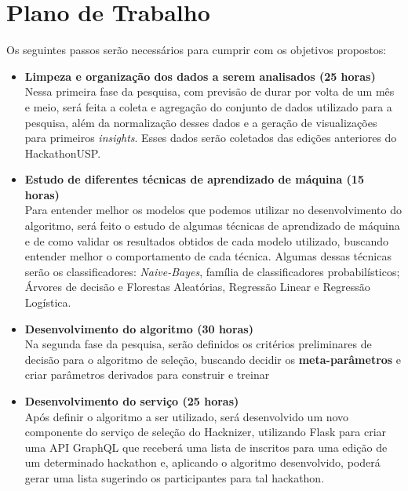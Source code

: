 \documentclass[10pt,twoside,a4paper]{article}
\begin{document}
    
\section{Plano de Trabalho}
  
  Os seguintes passos serão necessários para cumprir com os objetivos propostos:

  \begin{itemize}
    \item \textbf{Limpeza e organização dos dados a serem analisados (25 horas)} \\
        Nessa primeira fase da pesquisa, com previsão de durar por volta de um mês e meio, será feita a coleta e agregação do conjunto de dados utilizado para a pesquisa, além da normalização desses dados e a geração de visualizações para primeiros \textit{insights}. Esses dados serão coletados das edições anteriores do HackathonUSP.
    
    \item \textbf{Estudo de diferentes técnicas de aprendizado de máquina (15 horas)} \\
        Para entender melhor os modelos que podemos utilizar no desenvolvimento do algoritmo, será feito o estudo de algumas técnicas de aprendizado de máquina e de como validar os resultados obtidos de cada modelo utilizado, buscando entender melhor o comportamento de cada técnica. Algumas dessas técnicas serão os classificadores: \textit{Naive-Bayes}, família de classificadores probabilísticos; Árvores de decisão e Florestas Aleatórias, Regressão Linear e Regressão Logística. 
    
    \item \textbf{Desenvolvimento do algoritmo (30 horas)} \\
        Na segunda fase da pesquisa, serão definidos os critérios preliminares de decisão para o algoritmo de seleção, buscando decidir os \textbf{meta-parâmetros} e criar parâmetros derivados para construir e treinar 
          
    \item \textbf{Desenvolvimento do serviço (25 horas)} \\
        Após definir o algoritmo a ser utilizado, será desenvolvido um novo componente do serviço de seleção do Hacknizer, utilizando Flask para criar uma API GraphQL  que receberá uma lista de inscritos para uma edição de um determinado hackathon e, aplicando o algoritmo desenvolvido, poderá gerar uma lista sugerindo os participantes para tal hackathon. 
    

\end{itemize}
\end{document}
